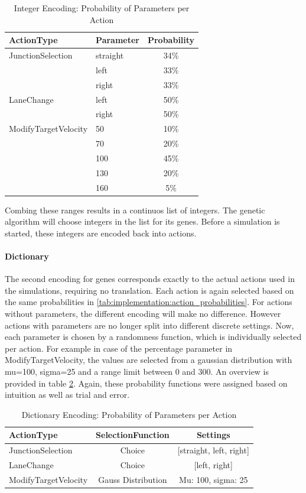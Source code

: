 \begin{table}[ht]
	\centering
	\begin{tabular}{llc}
		\hline
		ActionType & Parameter & Probability \\
		\hline
		JunctionSelection 	& straight & 34\% \\
		& left & 33\% \\
		& right & 33\% \\
		\hline
		LaneChange 			& left & 50\% \\
		& right & 50\% \\
		\hline
		ModifyTargetVelocity & 50 & 10\%\\
		& 70 & 20\%\\
		& 100 & 45\%\\
		& 130 & 20\%\\
		& 160 & 5\%\\
		\hline
	\end{tabular}
	\caption{Integer Encoding: Probability of Parameters per Action}
	\label{tab:implementation:integer_encoding_probabilities}
\end{table}

Combing these ranges results in a continuos list of integers. The genetic algorithm will choose integers in the list for its genes. Before a simulation is started, these integers are encoded back into actions.

\paragraph{Dictionary}
The second encoding for genes corresponds exactly to the actual actions used in the simulations, requiring no translation. Each action is again selected based on the same probabilities in \ref{tab:implementation:action_probabilities}. For actions without parameters, the different encoding will make no difference. However actions with parameters are no longer split into different discrete settings. Now, each parameter is chosen by a randomness function, which is individually selected per action. For example in case of the percentage parameter in ModifyTargetVelocity, the values are selected from a gaussian distribution with mu=100, sigma=25 and a range limit between 0 and 300. An overview is provided in table \ref{tab:implementation:dict_encoding_probabilities}.
Again, these probability functions were assigned based on intuition as well as trial and error. 

\begin{table}[ht]
	\centering
	\begin{tabular}{lcc}
		\hline
		ActionType & SelectionFunction & Settings \\
		\hline
		JunctionSelection 	& Choice & [straight, left, right] \\
		LaneChange 			& Choice & [left, right]\\
		ModifyTargetVelocity & Gauss Distribution & Mu: 100, sigma: 25\\
		\hline
	\end{tabular}
	\caption{Dictionary Encoding: Probability of Parameters per Action}
	\label{tab:implementation:dict_encoding_probabilities}
\end{table}

